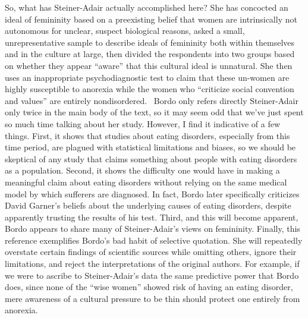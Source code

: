 \documentclass[11pt]{article}
\begin{document}
    So, what has Steiner-Adair actually accomplished here? She has concocted an ideal of femininity based on a preexisting belief that women are intrinsically not autonomous for unclear, suspect biological reasons, asked a small, unrepresentative sample to describe ideals of femininity both within themselves and in the culture at large, then divided the respondents into two groups based on whether they appear ``aware'' that this cultural ideal is unnatural. She then uses an inappropriate psychodiagnostic test to claim that these un-women are highly susceptible to anorexia while the women who ``criticize social convention and values'' are entirely nondisordered.~\autocite[106. I'm not even getting into the sample responses that Steiner-Adair shares, which reveal a shocking amount of prompting for these criticisms she reports in the Super Woman group.]{SteinerAdair86} Bordo only refers directly Steiner-Adair only twice in the main body of the text, so it may seem odd that we've just spent so much time talking about her study. However, I find it indicative of a few things. First, it shows that studies about eating disorders, especially from this time period, are plagued with statistical limitations and biases, so we should be skeptical of any study that claims something about people with eating disorders as a population. Second, it shows the difficulty one would have in making a meaningful claim about eating disorders without relying on the same medical model by which sufferers are diagnosed. In fact, Bordo later specifically criticizes David Garner's beliefs about the underlying causes of eating disorders, despite apparently trusting the results of his test. Third, and this will become apparent, Bordo appears to share many of Steiner-Adair's views on femininity. Finally, this reference exemplifies Bordo's bad habit of selective quotation. She will repeatedly overstate certain findings of scientific sources while omitting others, ignore their limitations, and reject the interpretations of the original authors. For example, if we were to ascribe to Steiner-Adair's data the same predictive power that Bordo does, since none of the ``wise women'' showed risk of having an eating disorder, mere awareness of a cultural pressure to be thin should protect one entirely from anorexia.
  
\end{document}
